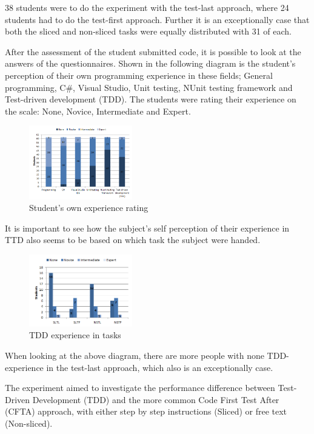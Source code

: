 \documentclass{sig-alternate-05-2015}
\begin{document}
38 students were to do the experiment with the test-last approach, where 24 students had to do the test-first approach. Further it is an exceptionally case that both the sliced and non-sliced tasks were equally distributed with 31 of each.

After the assessment of the student submitted code, it is possible to look at the answers of the questionnaires. Shown in the following diagram is the student's perception of their own programming experience in these fields; General programming, C{\#}, Visual Studio, Unit testing, NUnit testing framework and Test-driven development (TDD).
The students were rating their experience on the scale: None, Novice, Intermediate and Expert.

\begin{figure}[H]
	\centering
	\includegraphics[width=0.4\textwidth]{img03}
	\caption{Student's own experience rating}
\end{figure}

It is important to see how the subject's self perception of their experience in TTD also seems to be based on which task the subject were handed.

\begin{figure}[H]
	\centering
	\includegraphics[width=0.4\textwidth]{img04}
	\caption{TDD experience in tasks}
\end{figure}

When looking at the above diagram, there are more people with none TDD-experience in the test-last approach, which also is an exceptionally case.

The experiment aimed to investigate the performance difference between Test-Driven Development (TDD) and the more common Code First Test After (CFTA) approach, with either step by step instructions (Sliced) or free text (Non-sliced).\\
\end{document}
